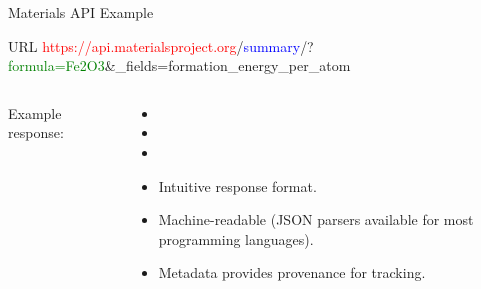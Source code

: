 \documentclass[aspectratio=169]{beamer}
\begin{document}
    \begin{frame}{Materials API Example}
        \begin{exampleblock}{URL}
            \small
            \textcolor{red}{https://api.materialsproject.org}/\textcolor{blue}{summary}/?\textcolor{green}{formula=Fe2O3}\&\_fields=formation\_energy\_per\_atom\\
        \end{exampleblock}
        \begin{columns}
            Example response:
            \inputminted{json}{mapi_response.txt}
            \begin{itemize}
                \item[]
                \item[]
                \item[]
                \item Intuitive response format.
                \item Machine-readable (JSON parsers available for most programming languages).
                \item Metadata provides provenance for tracking.
            \end{itemize}
        \end{columns}
    \end{frame}
\end{document}
